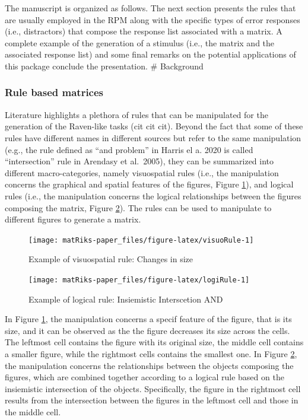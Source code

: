 The manuscript is organized as follows.
The next section presents the rules that are usually employed in the RPM along with the specific types of error responses (i.e., distractors) that compose the response list associated with a matrix. A complete example of the generation of a stimulus (i.e., the matrix and the associated response list) and some final remarks on the potential applications of this package conclude the presentation.
\# Background

\subsubsection{Rule based matrices}\label{rule-based-matrices}

Literature highlights a plethora of rules that can be manipulated for the generation of the Raven-like tasks (cit cit cit).
Beyond the fact that some of these rules have different names in different sources but refer to the same manipulation (e.g., the rule defined as ``and problem'' in Harris el a. 2020 is called ``intersection'' rule in Arendasy et al.~2005), they can be summarized into different macro-categories, namely visuospatial rules (i.e., the manipulation concerns the graphical and spatial features of the figures, Figure \ref{fig:visuoRule}), and logical rules (i.e., the manipulation concerns the logical relationships between the figures composing the matrix, Figure \ref{fig:logiRule}). The rules can be used to manipulate to different figures to generate a matrix.

\begin{figure}

{\centering \texttt{[image: matRiks-paper\_files/figure-latex/visuoRule-1]} 

}

\caption{Example of visuospatial rule: Changes in size}\label{fig:visuoRule}
\end{figure}

\begin{figure}

{\centering \texttt{[image: matRiks-paper\_files/figure-latex/logiRule-1]} 

}

\caption{Example of logical rule: Insiemistic Interscetion AND}\label{fig:logiRule}
\end{figure}

In Figure \ref{fig:visuoRule}, the manipulation concerns a specif feature of the figure, that is its size, and it can be observed as the the figure decreases its size across the cells.
The leftmost cell contains the figure with its original size, the middle cell contains a smaller figure, while the rightmost cells contains the smallest one.
In Figure \ref{fig:logiRule}, the manipulation concerns the relationships between the objects composing the figures, which are combined together according to a logical rule based on the insiemistic intersection of the objects. Specifically, the figure in the rightmost cell results from the intersection between the figures in the leftmost cell and those in the middle cell.


